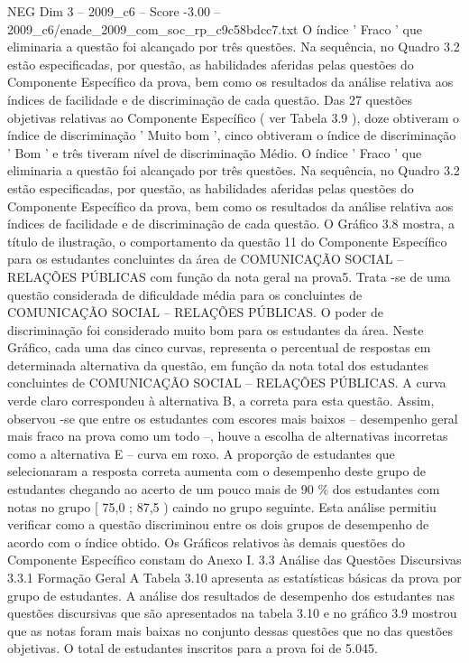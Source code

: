 \begin{textsample}{NEG Dim 3 – 2009\_c6 – Score -3.00 – 2009\_c6/enade\_2009\_com\_soc\_rp\_c9c58bdcc7.txt}
O índice ' Fraco ' que eliminaria a questão foi alcançado por três questões.
Na sequência, no Quadro 3.2 estão especificadas, por questão, as habilidades aferidas pelas questões do Componente Específico da prova, bem como os resultados da análise relativa aos índices de facilidade e de discriminação de cada questão.
Das 27 questões objetivas relativas ao Componente Específico ( ver Tabela 3.9 ), doze obtiveram o índice de discriminação ' Muito bom ', cinco obtiveram o índice de discriminação ' Bom ' e três tiveram nível de discriminação Médio.
O índice ' Fraco ' que eliminaria a questão foi alcançado por três questões.
Na sequência, no Quadro 3.2 estão especificadas, por questão, as habilidades aferidas pelas questões do Componente Específico da prova, bem como os resultados da análise relativa aos índices de facilidade e de discriminação de cada questão.
O Gráfico 3.8 mostra, a título de ilustração, o comportamento da questão 11 do Componente Específico para os estudantes concluintes da área de COMUNICAÇÃO SOCIAL – RELAÇÕES PÚBLICAS com função da nota geral na prova5.
Trata -se de uma questão considerada de dificuldade média para os concluintes de COMUNICAÇÃO SOCIAL – RELAÇÕES PÚBLICAS.
O poder de discriminação foi considerado muito bom para os estudantes da área.
Neste Gráfico, cada uma das cinco curvas, representa o percentual de respostas em determinada alternativa da questão, em função da nota total dos estudantes concluintes de COMUNICAÇÃO SOCIAL – RELAÇÕES PÚBLICAS.
A curva verde claro correspondeu à alternativa B, a correta para esta questão.
Assim, observou -se que entre os estudantes com escores mais baixos – desempenho geral mais fraco na prova como um todo –, houve a escolha de alternativas incorretas como a alternativa E – curva em roxo.
A proporção de estudantes que selecionaram a resposta correta aumenta com o desempenho deste grupo de estudantes chegando ao acerto de um pouco mais de 90 \% dos estudantes com notas no grupo [ 75,0 ; 87,5 ) caindo no grupo seguinte.
Esta análise permitiu verificar como a questão discriminou entre os dois grupos de desempenho de acordo com o índice obtido.
Os Gráficos relativos às demais questões do Componente Específico constam do Anexo I. 3.3 Análise das Questões Discursivas 3.3.1 Formação Geral A Tabela 3.10 apresenta as estatísticas básicas da prova por grupo de estudantes.
A análise dos resultados de desempenho dos estudantes nas questões discursivas que são apresentados na tabela 3.10 e no gráfico 3.9 mostrou que as notas foram mais baixas no conjunto dessas questões que no das questões objetivas.
O total de estudantes inscritos para a prova foi de 5.045.

\end{textsample}
